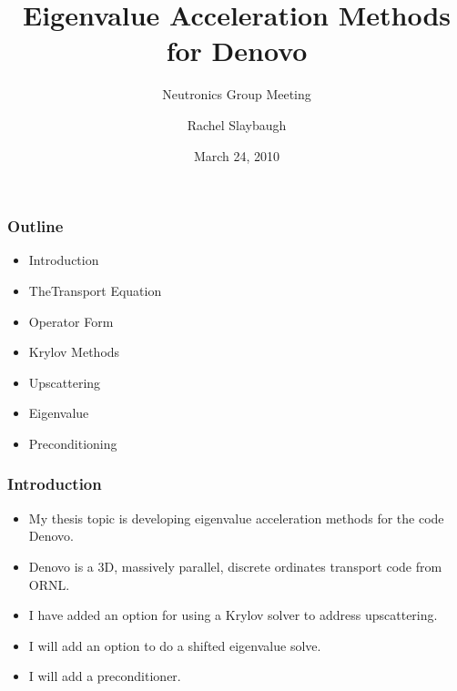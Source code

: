 \documentclass{beamer}
\title{Eigenvalue Acceleration Methods for Denovo}
\author{Rachel Slaybaugh}
\subtitle{Neutronics Group Meeting }
\date{March 24, 2010}
\begin{document}
\begin{frame}
  \titlepage
\end{frame}

\begin{frame}
  \frametitle{Outline}
  
\begin{itemize}
  \item Introduction
  \item TheTransport Equation 
  \item Operator Form
  \item Krylov Methods
  \item Upscattering
  \item Eigenvalue
  \item Preconditioning
\end{itemize}

\end{frame}

\begin{frame}
  \frametitle{Introduction}
  
\begin{itemize}
  \item My thesis topic is developing eigenvalue acceleration methods for the code Denovo.
  \item Denovo is a 3D, massively parallel, discrete ordinates transport code from ORNL.
  \item I  have added an option for using a Krylov solver to address upscattering.
  \item I will add an option to do a shifted eigenvalue solve.
  \item I will add a preconditioner.
\end{itemize}

\end{frame}
\end{document}
